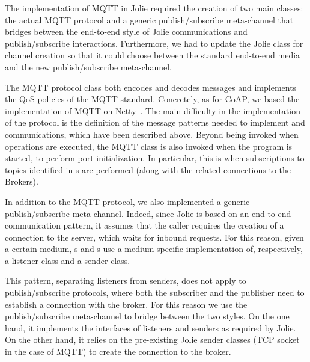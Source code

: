 The implementation of MQTT in Jolie required the creation of two main classes:
the actual MQTT protocol and a generic publish/subscribe meta-channel that
bridges between the end-to-end style of Jolie communications and
publish/subscribe interactions. Furthermore, we had to update the Jolie class
for channel creation so that it could choose between the standard end-to-end
media and the new publish/subscribe meta-channel.

The MQTT protocol class both encodes and decodes messages and implements the QoS
policies of the MQTT standard. Concretely, as for CoAP, we based the
implementation of MQTT on Netty~\cite{maurer16}. The main difficulty in the
implementation of the protocol is the definition of the message patterns needed
to implement  and  communications, which have
been described above. Beyond being invoked when operations are executed, the
MQTT class is also invoked when the program is started, to perform port
initialization. In particular, this is when subscriptions to topics identified
in s are performed (along with the related connections to the
Brokers).

In addition to the MQTT protocol, we also implemented a generic
publish/subscribe meta-channel. Indeed, since Jolie is based on an end-to-end
communication pattern, it assumes that the caller requires the creation of a
connection to the server, which waits for inbound requests. For this reason,
given a certain medium, s and s
use a medium-specific implementation of, respectively,
a listener class and a sender class.

%
This pattern, separating listeners from senders, does not apply to
publish/subscribe protocols, where both the subscriber and the publisher need to
establish a connection with the broker. For this reason we use the
publish/subscribe meta-channel to bridge between the two styles. On the one
hand, it implements the interfaces of listeners and senders as required by
Jolie. On the other hand, it relies on the pre-existing Jolie sender classes
(TCP socket in the case of MQTT) to create the connection to the broker.